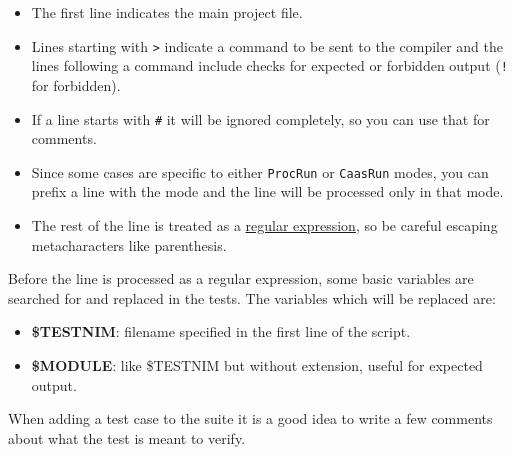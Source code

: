 \begin{itemize}
\tightlist
\item
  The first line indicates the main project file.
\item
  Lines starting with \texttt{\textgreater{}} indicate a command to be
  sent to the compiler and the lines following a command include checks
  for expected or forbidden output (\texttt{!} for forbidden).
\item
  If a line starts with \texttt{\#} it will be ignored completely, so
  you can use that for comments.
\item
  Since some cases are specific to either \texttt{ProcRun} or
  \texttt{CaasRun} modes, you can prefix a line with the mode and the
  line will be processed only in that mode.
\item
  The rest of the line is treated as a \href{re.html}{regular
  expression}, so be careful escaping metacharacters like parenthesis.
\end{itemize}

Before the line is processed as a regular expression, some basic
variables are searched for and replaced in the tests. The variables
which will be replaced are:

\begin{itemize}
\tightlist
\item
  \textbf{\$TESTNIM}: filename specified in the first line of the
  script.
\item
  \textbf{\$MODULE}: like \$TESTNIM but without extension, useful for
  expected output.
\end{itemize}

When adding a test case to the suite it is a good idea to write a few
comments about what the test is meant to verify.
